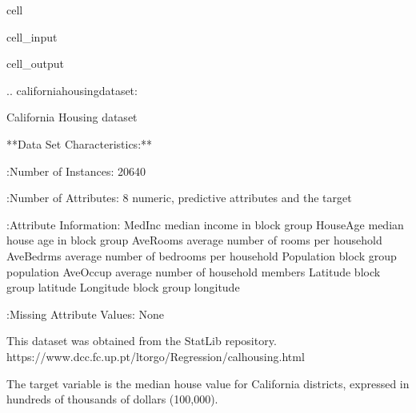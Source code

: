 \documentclass[letterpaper,10pt,english]{jupyterBook}
\begin{document}
\begin{sphinxuseclass}{cell}\begin{sphinxVerbatimInput}

\begin{sphinxuseclass}{cell_input}
\begin{sphinxVerbatim}[commandchars=\\\{\}]
\end{sphinxVerbatim}

\end{sphinxuseclass}\end{sphinxVerbatimInput}
\begin{sphinxVerbatimOutput}

\begin{sphinxuseclass}{cell_output}
\begin{sphinxVerbatim}[commandchars=\\\{\}]
.. \PYGZus{}california\PYGZus{}housing\PYGZus{}dataset:

California Housing dataset
\PYGZhy{}\PYGZhy{}\PYGZhy{}\PYGZhy{}\PYGZhy{}\PYGZhy{}\PYGZhy{}\PYGZhy{}\PYGZhy{}\PYGZhy{}\PYGZhy{}\PYGZhy{}\PYGZhy{}\PYGZhy{}\PYGZhy{}\PYGZhy{}\PYGZhy{}\PYGZhy{}\PYGZhy{}\PYGZhy{}\PYGZhy{}\PYGZhy{}\PYGZhy{}\PYGZhy{}\PYGZhy{}\PYGZhy{}

**Data Set Characteristics:**

    :Number of Instances: 20640

    :Number of Attributes: 8 numeric, predictive attributes and the target

    :Attribute Information:
        \PYGZhy{} MedInc        median income in block group
        \PYGZhy{} HouseAge      median house age in block group
        \PYGZhy{} AveRooms      average number of rooms per household
        \PYGZhy{} AveBedrms     average number of bedrooms per household
        \PYGZhy{} Population    block group population
        \PYGZhy{} AveOccup      average number of household members
        \PYGZhy{} Latitude      block group latitude
        \PYGZhy{} Longitude     block group longitude

    :Missing Attribute Values: None

This dataset was obtained from the StatLib repository.
https://www.dcc.fc.up.pt/\PYGZti{}ltorgo/Regression/cal\PYGZus{}housing.html

The target variable is the median house value for California districts,
expressed in hundreds of thousands of dollars (\PYGZdl{}100,000).


\end{sphinxVerbatim}
\end{sphinxuseclass}
\end{sphinxVerbatimOutput}
\end{sphinxuseclass}
\end{document}
